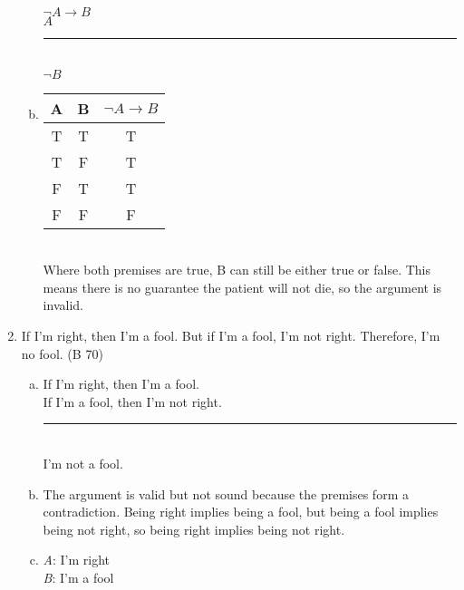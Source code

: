 \documentclass{article}
\begin{document}
\begin{enumerate}
\begin{enumerate}[(a)]
                        $\neg A \to B$\\
                        $A$\\
                        \rule{5em}{.5pt}\\
                        $\neg B$
                  \item
                        \begin{tabular}{c|c|c}
                              A                      & B & $\neg A \to B$ \\
                              \hline
                              T                      & T & T              \\
                              T                      & F & T              \\
                              \rowcolor{lightgray} F & T & T              \\
                              \rowcolor{lightgray} F & F & F
                        \end{tabular} \\
                        Where both premises are true, B can still be either true or false. This means there is no guarantee the patient will not die, so the argument is invalid.
            \end{enumerate}
      \item If I'm right, then I'm a fool. But if I'm a fool, I'm not right. Therefore, I'm no fool. (B 70)
            \begin{enumerate}[(a)]
                  \item If I'm right, then I'm a fool.\\
                        If I'm a fool, then I'm not right.\\
                        \rule{15em}{.5pt}\\
                        I'm not a fool.
                  \item The argument is valid but not sound because the premises form a contradiction. Being right implies being a fool, but being a fool implies being not right, so being right implies being not right.
                  \item \textit{A}: I'm right\\
                        \textit{B}: I'm a fool\\


\end{enumerate}
\end{enumerate}
\end{document}
